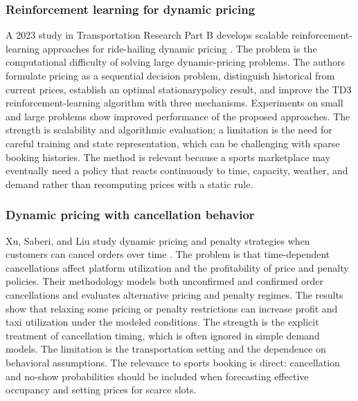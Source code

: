 \subsubsection{Reinforcement learning for dynamic pricing}
A 2023 study in Transportation Research Part B develops scalable reinforcement-learning approaches for ride-hailing dynamic pricing \cite{r6}. The problem is the computational difficulty of solving large dynamic-pricing problems. The authors formulate pricing as a sequential decision problem, distinguish historical from current prices, establish an optimal stationarypolicy result, and improve the TD3 reinforcement-learning algorithm with three mechanisms. Experiments on small and large problems show improved performance of the proposed approaches. The strength is scalability and algorithmic evaluation; a limitation is the need for careful training and state representation, which can be challenging with sparse booking histories. The method is relevant because a sports marketplace may eventually need a policy that reacts continuously to time, capacity, weather, and demand rather than recomputing prices with a static rule.

\subsubsection{Dynamic pricing with cancellation behavior}
Xu, Saberi, and Liu study dynamic pricing and penalty strategies when customers can cancel orders over time \cite{r7}. The problem is that time-dependent cancellations affect platform utilization and the profitability of price and penalty policies. Their methodology models both unconfirmed and confirmed order cancellations and evaluates alternative pricing and penalty regimes. The results show that relaxing some pricing or penalty restrictions can increase profit and taxi utilization under the modeled conditions. The strength is the explicit treatment of cancellation timing, which is often ignored in simple demand models. The limitation is the transportation setting and the dependence on behavioral assumptions. The relevance to sports booking is direct: cancellation and no-show probabilities should be included when forecasting effective occupancy and setting prices for scarce slots.

